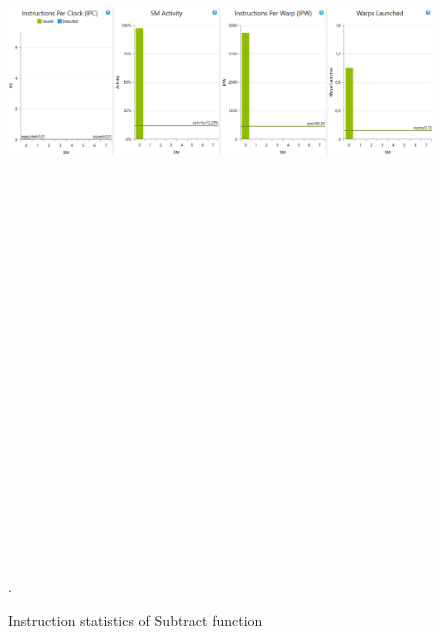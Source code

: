 \documentclass[oneside,openright,12pt,final,en]{mgr}
\begin{document}
\begin{figure}[H]
	\centering
	\includegraphics[width=\textwidth, height=26cm,keepaspectratio]{subtract_instructions}.
	\caption{Instruction statistics of Subtract function}
	\label{fig:subtract_instructions}
\end{figure}
\end{document}
